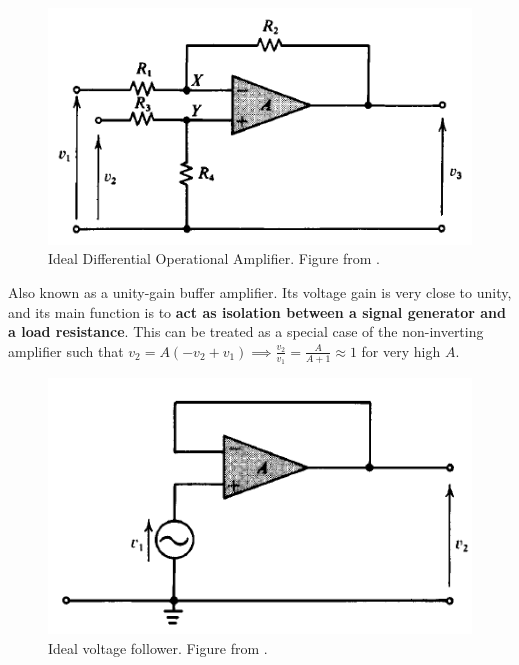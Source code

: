 \documentclass[a4paper]{article}
\begin{document}
\begin{figure}[H]
    \centering
    \includegraphics[scale=0.65]{differentialideal.PNG}
    \caption{Ideal Differential Operational Amplifier. Figure from \cite{ahmed_spreadbury_1984}.}
\end{figure}
\begin{eg}
Also known as a unity-gain buffer amplifier. Its voltage gain is very close to unity, and its main function is to \textbf{act as isolation between a signal generator and a load resistance}. This can be treated as a special case of the non-inverting amplifier such that $v_2=A(-v_2+v_1)\implies\frac{v_2}{v_1}=\frac{A}{A+1}\approx 1$ for very high $A$.
\end{eg}
\begin{figure}[H]
    \centering
    \includegraphics[scale=0.6]{bufferideal.PNG}
    \caption{Ideal voltage follower. Figure from \cite{ahmed_spreadbury_1984}.}
    \label{bufferideal}
\end{figure}
\end{document}

